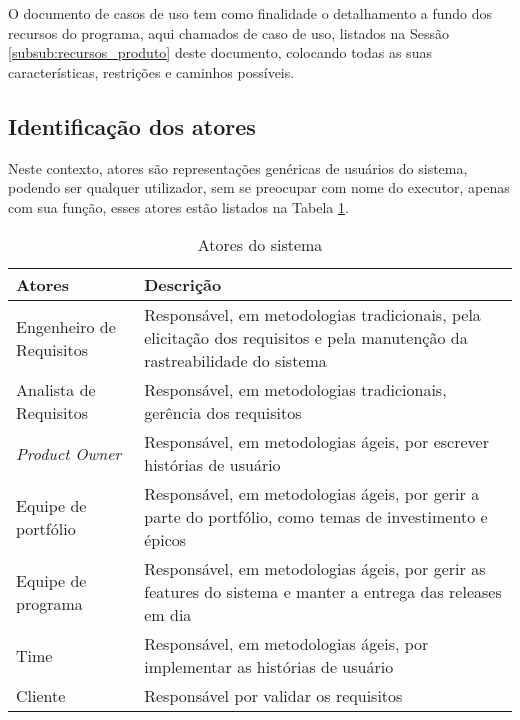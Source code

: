 
O documento de casos de uso tem como finalidade o detalhamento a fundo dos recursos do programa, aqui chamados de caso de uso, listados na Sessão \ref{subsub:recursos_produto} deste documento, colocando todas as suas características, restrições e caminhos possíveis.

\subsection{Identificação dos atores}

Neste contexto, atores são representações genéricas de usuários do sistema, podendo ser qualquer utilizador, sem se preocupar com nome do executor, apenas com sua função, esses atores estão listados na Tabela \ref{tab:atores}.

\begin{table}[H]
\centering
\begin{tabular}{|l|p{8cm}|}

\hline
\textbf{Atores} &
\textbf{Descrição}
\\ \hline
Engenheiro de Requisitos &
Responsável, em metodologias tradicionais, pela elicitação dos requisitos e pela manutenção da rastreabilidade do sistema
\\ \hline
Analista de Requisitos &
Responsável, em metodologias tradicionais, gerência dos requisitos
\\ \hline
\textit{Product Owner} &
Responsável, em metodologias ágeis, por escrever histórias de usuário
\\ \hline
Equipe de portfólio &
Responsável, em metodologias ágeis, por gerir a parte do portfólio, como temas de investimento e épicos
\\ \hline
Equipe de programa &
Responsável, em metodologias ágeis, por gerir as features do sistema e manter a entrega das releases em dia
\\ \hline
Time &
Responsável, em metodologias ágeis, por implementar as histórias de usuário
\\ \hline
Cliente &
Responsável por validar os requisitos
\\ \hline

\end{tabular}
\caption{Atores do sistema}
\label{tab:atores}
\end{table}

